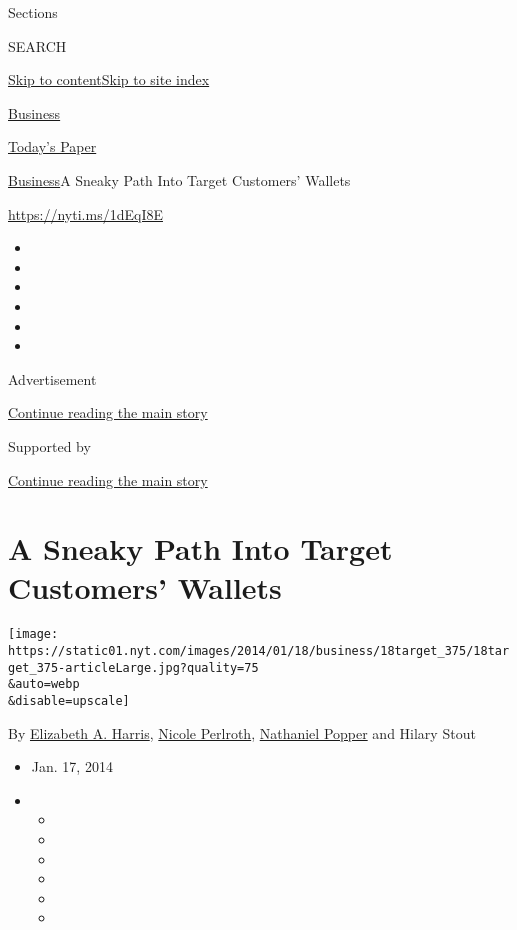 Sections

SEARCH

\protect\hyperlink{site-content}{Skip to
content}\protect\hyperlink{site-index}{Skip to site index}

\href{https://www.nytimes.com/section/business}{Business}

\href{https://myaccount.nytimes.com/auth/login?response_type=cookie\&client_id=vi}{}

\href{https://www.nytimes.com/section/todayspaper}{Today's Paper}

\href{/section/business}{Business}\textbar{}A Sneaky Path Into Target
Customers' Wallets

\url{https://nyti.ms/1dEqI8E}

\begin{itemize}
\item
\item
\item
\item
\item
\item
\end{itemize}

Advertisement

\protect\hyperlink{after-top}{Continue reading the main story}

Supported by

\protect\hyperlink{after-sponsor}{Continue reading the main story}

\hypertarget{a-sneaky-path-into-target-customers-wallets}{%
\section{A Sneaky Path Into Target Customers'
Wallets}\label{a-sneaky-path-into-target-customers-wallets}}

\texttt{[image: https://static01.nyt.com/images/2014/01/18/business/18target\_375/18target\_375-articleLarge.jpg?quality=75\\\&auto=webp\\\&disable=upscale]}

By \href{http://www.nytimes.com/by/elizabeth-a-harris}{Elizabeth A.
Harris}, \href{http://www.nytimes.com/by/nicole-perlroth}{Nicole
Perlroth}, \href{http://www.nytimes.com/by/nathaniel-popper}{Nathaniel
Popper} and Hilary Stout

\begin{itemize}
\item
  Jan. 17, 2014
\item
  \begin{itemize}
  \item
  \item
  \item
  \item
  \item
  \item
  \end{itemize}
\end{itemize}

